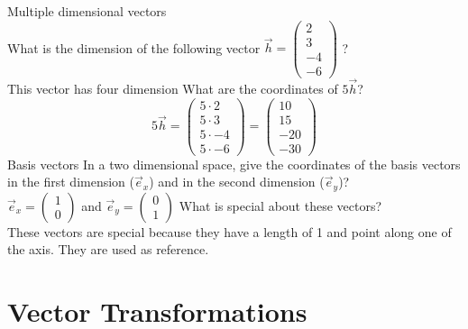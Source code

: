 \documentclass[a4paper]{report}
\begin{document}
\begin{Answer}[ref=exVEC]
\begin{center}
\begin{tikzpicture}[scale=0.5]
\end{tikzpicture}
\end{center}
\Question Multiple dimensional vectors\\
\subQuestion What is the dimension of the following vector $\vec{h} = \begin{pmatrix}
2 \\
3 \\
-4\\
-6
\end{pmatrix}$ ?\\
This vector has four dimension
\subQuestion What are the coordinates of $5\vec{h}$?
\begin{equation}
5\vec{h} = \begin{pmatrix}
5\cdot 2 \\
5\cdot 3 \\
5\cdot -4\\
5\cdot -6
\end{pmatrix}
 = \begin{pmatrix}
10 \\
15 \\
-20\\
-30
\end{pmatrix} 
\end{equation}
\Question Basis vectors
\subQuestion In a two dimensional space, give the coordinates of the basis vectors in the first dimension ($\vec{e}_x$) and in the second dimension ($\vec{e}_y$)?\\
$\vec{e}_x = \begin{pmatrix}
1 \\
0 
\end{pmatrix}$ and $\vec{e}_y = \begin{pmatrix}
0 \\
1 
\end{pmatrix}$
\subQuestion What is special about these vectors?\\
These vectors are special because they have a length of 1 and point along one of the axis. They are used as reference.  

\end{Answer}

\section{Vector Transformations}
\end{document}
